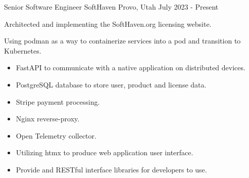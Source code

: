 
\begin{cventries}
\cventry
{Senior Software Engineer} %
{SoftHaven} %
{Provo, Utah} %
{July 2023 - Present} %
{
	\begin{cvitems} %
		\item {Architected and implementing the SoftHaven.org licensing website.}
		\item {Using podman as a way to containerize services into a pod and transition to Kubernetes.}
		\begin{itemize}
			\item {FastAPI to communicate with a native application on distributed devices.}
			\item {PostgreSQL database to store user, product and license data.}
			\item {Stripe payment processing.}
			\item {Nginx reverse-proxy.}
			\item {Open Telemetry collector.}
			\item {Utilizing htmx to produce web application user interface.}
			\item {Provide \Cpp and \Csh RESTful interface libraries for developers to use.}
		\end{itemize}
	\end{cvitems}
}



\end{cventries}
